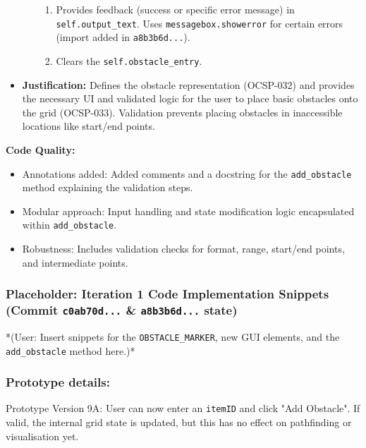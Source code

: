 \begin{itemize}
\begin{itemize}
\begin{enumerate}
			\item Provides feedback (success or specific error message) in \verb|self.output_text|. Uses \verb|messagebox.showerror| for certain errors (import added in \verb|a8b3b6d...|).
			\item Clears the \verb|self.obstacle_entry|.
		\end{enumerate}
	\end{itemize}
	\item \textbf{Justification:} Defines the obstacle representation (OCSP-032) and provides the necessary UI and validated logic for the user to place basic obstacles onto the grid (OCSP-033). Validation prevents placing obstacles in inaccessible locations like start/end points.
\end{itemize}

\textbf{Code Quality:}
\begin{itemize}
	\item Annotations added: Added comments and a docstring for the \verb|add_obstacle| method explaining the validation steps.
	\item Modular approach: Input handling and state modification logic encapsulated within \verb|add_obstacle|.
	\item Robustness: Includes validation checks for format, range, start/end points, and intermediate points.
\end{itemize}

\newpage
\subsubsection*{Placeholder: Iteration 1 Code Implementation Snippets (Commit \verb|c0ab70d...| & \verb|a8b3b6d...| state)}
*(User: Insert snippets for the \verb|OBSTACLE_MARKER|, new GUI elements, and the \verb|add_obstacle| method here.)*
\newpage

\subsubsection{Prototype details:}
Prototype Version 9A: User can now enter an \verb|itemID| and click "Add Obstacle". If valid, the internal grid state is updated, but this has no effect on pathfinding or visualisation yet.

